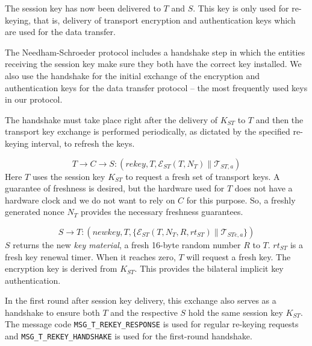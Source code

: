 The session key has now been delivered to $T$ and $S$. This key is only
used for re-keying, that is, delivery of transport encryption and authentication keys
which are used for the data transfer. 

The Needham-Schroeder protocol includes a handshake step in which the entities
receiving the session key make sure they both have the correct key installed. We
also use the handshake for the initial exchange of the
encryption and authentication keys for the data transfer protocol -- the most
frequently used keys in our protocol. 

The handshake must take place right after the delivery of $K_{ST}$ to $T$
and then the transport key exchange is performed periodically, as dictated by the specified re-keying interval, to refresh the keys.

\[
T \rightarrow C \rightarrow S: (rekey,T,\mathcal{E}_{ST}(T,N_T) \parallel \mathcal{T}_{ST,a})
\]
%
Here $T$ uses the session key $K_{ST}$ to request a fresh set of transport keys. A
guarantee of freshness is desired, but the hardware used for $T$ does
not have a hardware clock and we do not want to rely on $C$ for this purpose. So, a freshly generated nonce $N_T$
provides the necessary freshness guarantees. 

\[
S \rightarrow T: (newkey,T, \{ \mathcal{E}_{ST}(T,N_T,R,rt_{ST}) \parallel \mathcal{T}_{STe,a} \} )
\]
%
$S$ returns the new \textit{key material}, a fresh 16-byte random number $R$ to
$T$.  $rt_{ST}$ is a fresh key renewal timer. When it reaches zero,
$T$ will request a fresh key. The encryption key is derived from
$K_{ST}$. This provides the bilateral implicit key authentication.

In the first round after session key delivery, this exchange also serves as a handshake to ensure both $T$ and the respective $S$ hold the same session key $K_{ST}$. The message code
\texttt{MSG\_T\_REKEY\_RESPONSE} is used for regular re-keying requests
and \texttt{MSG\_T\_REKEY\_HANDSHAKE} is used for the first-round handshake.

%

